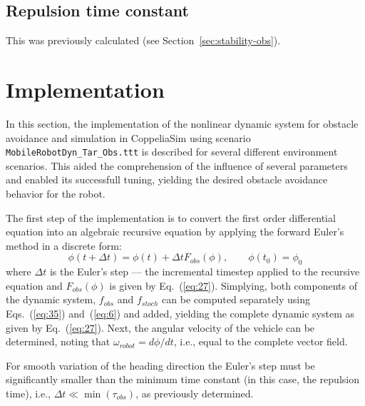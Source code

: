 \subsection{Repulsion time constant}%
\label{sec:repuls-time-const}
This was previously calculated (see Section~\ref{sec:stability-obs}). 
%
%
\section{Implementation}%
\label{sec:implementation-obs}
In this section, the implementation of the nonlinear dynamic system for obstacle
avoidance and simulation in CoppeliaSim using scenario
\texttt{MobileRobotDyn\_Tar\_Obs.ttt} is described for several different environment
scenarios. This aided the comprehension of the influence of several parameters
and enabled its successfull tuning, yielding the desired obstacle avoidance
behavior for the robot.

The first step of the implementation is to convert the first order differential
equation into an algebraic recursive equation by applying the forward Euler's
method in a discrete form:
\begin{equation}
  \label{eq:34}
  \phi(t + \Delta t) = \phi(t) + \Delta t F_{obs}(\phi), \qquad \phi(t_0) = \phi_0
\end{equation}
where $\Delta t$ is the Euler's step --- the incremental timestep applied to
the recursive equation and $F_{obs}(\phi)$ is given by Eq.~(\ref{eq:27}).
Simplying, both components of the dynamic system, $f_{obs}$ and $f_{stoch}$ can be
computed separately using Eqs.~(\ref{eq:35}) and~(\ref{eq:6}) and added,
yielding the complete dynamic system as given by Eq.~(\ref{eq:27}). Next, the
angular velocity of the vehicle can be determined, noting that $\omega _{robot}
= d \phi /dt$, i.e., equal to the complete vector field.

For smooth variation of the heading direction the
Euler's step must be significantly smaller than the minimum time constant (in
this case, the repulsion time), i.e., $\Delta t \ll \min(\tau _{obs})$, as
previously determined.

